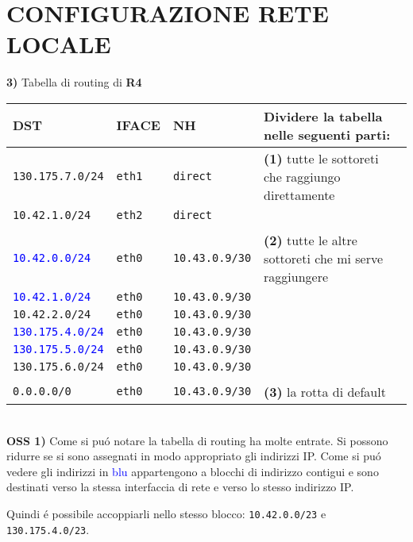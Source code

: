 \documentclass{article}
\def\code#1{\texttt{#1}}
\newenvironment{homeworkProblem}[1][-1]{
    \section{CONFIGURAZIONE RETE LOCALE}
}{}
\begin{document}
\begin{homeworkProblem}
 	\pagebreak
 	\textbf{3)} Tabella di routing di \textbf{R4}\\
 	\begin{center}
 	\begin{tabular}{l l l | p{8cm}}
  		\textbf{DST} & \textbf{IFACE} & \textbf{NH} & Dividere la tabella nelle seguenti parti: \\
  		\hline
 		\code{130.175.7.0/24} & \code{eth1} & \code{direct} & \textbf{(1)} tutte le sottoreti che raggiungo
 		                                                      direttamente\\
 		\code{10.42.1.0/24}   & \code{eth2} & \code{direct} &\\\\
 		
 		\textcolor{blue}{\code{10.42.0.0/24}} & \code{eth0} & \code{10.43.0.9/30} & \textbf{(2)} tutte le 
 		                                                                            altre sottoreti che mi 
 		                                                                            serve raggiungere\\
 		\textcolor{blue}{\code{10.42.1.0/24}} & \code{eth0} & \code{10.43.0.9/30}&\\
 		\code{10.42.2.0/24} & \code{eth0} & \code{10.43.0.9/30}&\\
 		\textcolor{blue}{\code{130.175.4.0/24}} & \code{eth0} & \code{10.43.0.9/30}&\\
 		\textcolor{blue}{\code{130.175.5.0/24}} & \code{eth0} & \code{10.43.0.9/30}&\\
 		\code{130.175.6.0/24} & \code{eth0} & \code{10.43.0.9/30}&\\\\
 		
 		\code{0.0.0.0/0} & \code{eth0} & \code{10.43.0.9/30}& \textbf{(3)} la rotta di default\\ 		
 	\end{tabular}
	\end{center}
	
	\textbf{\\OSS 1)} Come si pu\'o notare la tabella di routing ha molte entrate. Si possono ridurre se si 
	sono assegnati in modo appropriato gli indirizzi IP. Come si pu\'o vedere gli indirizzi in 
	\textcolor{blue}{blu} appartengono a blocchi di indirizzo contigui e sono destinati verso la stessa 
	interfaccia di rete e verso lo stesso indirizzo IP.

	Quindi \'e possibile accoppiarli nello stesso blocco: \code{10.42.0.0/23} e \code{130.175.4.0/23}.	


\end{homeworkProblem}
\end{document}
